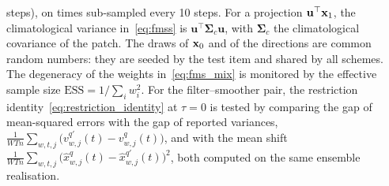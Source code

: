 steps), on times sub-sampled every 10 steps. For a projection $\mathbf{u}^\top\mathbf{x}_1$, the climatological
variance in~\eqref{eq:fmss} is $\mathbf{u}^\top\boldsymbol{\Sigma}_c\mathbf{u}$, with
$\boldsymbol{\Sigma}_c$ the climatological covariance of the patch. The draws of $\mathbf{x}_0$ and of the directions
are common random numbers: they are seeded by the test item and shared by all schemes.
The degeneracy of the weights in~\eqref{eq:fms_mix} is monitored by the effective sample
size $\mathrm{ESS} = 1/\sum_i w_i^2$. For the
filter--smoother pair, the restriction identity~\eqref{eq:restriction_identity} at
$\tau = 0$ is tested by comparing the gap of mean-squared errors with the gap of
reported variances, $\frac{1}{WTn}\sum_{w,t,j}\big(v^{q'}_{w,j}(t) - v^{q}_{w,j}(t)\big)$,
and with the mean shift
$\frac{1}{WTn}\sum_{w,t,j}\big(\hat x^{q}_{w,j}(t) - \hat x^{q'}_{w,j}(t)\big)^2$, both
computed on the same ensemble realisation.

